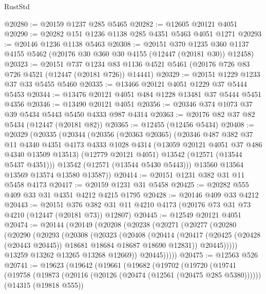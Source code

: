 \begin{lexlean}{RustStd}
\begin{coremodule}
@20280 := @20159 @1237 @285 @5465
@20282 := @12605 @20121 @4051
@20290 := @20282 @151 @1236 @1138 @285 @4351 @5463 @4051 @1271
@20293 := @20146 @1236 @1138 @5463
@20308 := @20151
    @370
    @1235
    @360
    @1137
    @4155
    @5462
    (@20176 @30 @360 @30 @4155 (@12447 (@20181 @30)) @12458)
@20323 := @20151
    @737
    @1234
    @83
    @1136
    @4521
    @5461
    (@20176 @726 @83 @726 @4521 (@12447 (@20181 @726)) @14441)
@20329 := @20151 @1229 @1233 @37 @33 @5455 @5460
@20335 := @13466 @20121 @4051 @1229 @37 @5444 @5453
@20344 := @13476 @20121 @4051 @484 @1228 @13481 @37 @5444 @5451 @4356
@20346 := @13490 @20121 @4051
@20356 := @20346 @374 @1073 @37 @39 @5434 @5443 @5450 @4333 @987 @4314
@20363 := @20176 @82 @37 @82 @5434 (@12447 (@20181 @82))
@20365 := @12455 (@12456 @5434)
@20408 := @20329
    (@20335
      (@20344
        (@20356
          (@20363 @20365)
          (@20346
            @487
            @382
            @37
            @11
            @4340
            @4351
            @4173
            @4333
            @1028
            @4314
            (@13059 @20121 @4051 @37 @486 @4340 @13509 @13513)
            (@12779 @20121 @4051)
            @13542
            (@12571 (@13544 @5437 @4351)))
          @13542
          (@12571 (@13544 @5430 @5443)))
        @13560
        @13564
        @13569
        @13574
        @13580
        @13587))
@20414 := @20151 @1231 @382 @31 @11 @5458 @4173
@20417 := @20159 @1231 @31 @5458
@20425 := @20282 @555 @409 @33 @31 @4351 @4212 @4215 @1795
@20428 := @20146 @409 @33 @4212
@20443 := @20151
    @376
    @382
    @31
    @11
    @4210
    @4173
    (@20176 @73 @31 @73 @4210 (@12447 (@20181 @73)) @12807)
@20445 := @12549 @20121 @4051
@20474 := @20144
    (@20149
      (@20208
        (@20238
          (@20271
            (@20277
              (@20280
                (@20290
                  (@20293
                    (@20308
                      (@20323
                        (@20408
                          (@20414
                            (@20417
                              (@20425 (@20428 (@20443 @20445)) @18681 @18684 @18687 @18690 @12831))
                            @20445)))))
                  @13259
                  @13262
                  @13265
                  @13268
                  @12669))
              @20445)))))
@20475 := @12563 @526
@20741 := @19623
    (@19642
      (@19661
        (@19682
          (@19702
            (@19720
              (@19741
                (@19758
                  (@19873 (@20116 (@20126 (@20474 (@12561 (@20475 @285 @5380))))))
                  (@14315 (@19818 @555))

\end{coremodule}
\end{lexlean}
